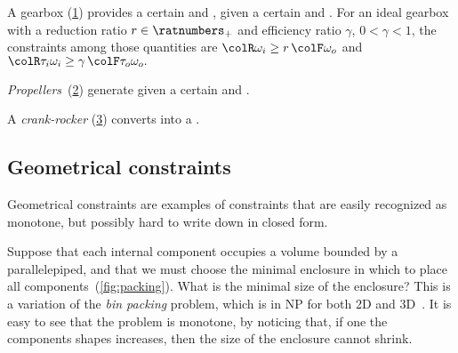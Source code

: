 \begin{example}
  A gearbox (\cref{fig:gearbox}) provides a certain  and , given a certain
   and . For
  an ideal gearbox with a reduction ratio $r \in \ratnumbers_+$ and
  efficiency ratio $\gamma$, $0<\gamma<1$, the constraints among
  those quantities are ${\colR \omega_i}\geq r\,{\colF \omega_o}$
  and ${\colR \tau_i\omega_i}\geq\gamma\,{\colF \tau_o\omega_o}.$
\end{example}

\begin{figure}[h]
  \begin{center}
  \end{center}
  \caption{}
  \label{fig:gearbox}
\end{figure}


\begin{example}
  \emph{Propellers}~(\cref{fig:propeller}) generate 
  given a certain  and .
\end{example}

\begin{figure}[h]
  \begin{center}
  \end{center}
  \caption{\label{fig:propeller}}
\end{figure}

\begin{example}
  A \emph{crank-rocker} (\cref{fig:crack}) converts  into a .
\end{example}

\begin{figure}[h]
  \centering
  \caption{\label{fig:crack}}
\end{figure}

\subsection{Geometrical constraints}

Geometrical constraints are examples of constraints that are easily recognized as monotone, but possibly hard to write down in closed form.

\begin{example}
  Suppose that each internal component occupies a volume
  bounded by a parallelepiped, and that we must choose the minimal enclosure
  in which to place all components~(\cref{fig:packing}). What
  is the minimal size of the enclosure? This is a variation of the \emph{bin
  packing} problem, which is in NP for both 2D and 3D~\cite{lodi02two}.
  It is easy to see that the problem is monotone, by noticing that,
  if one the components shapes increases, then the size of the enclosure
  cannot shrink.
\end{example}

